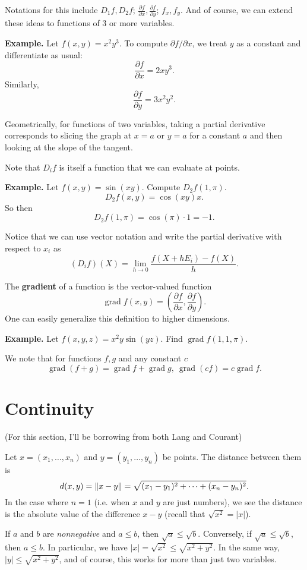 \documentclass{article}
\DeclareMathOperator{\grd}{grad}
\begin{document}
Notations for this include $D_1 f, D_2 f$; $\frac{\partial f}{\partial x}, \frac{\partial f}{\partial y}$; $f_x, f_y$. 
And of course, we can extend these ideas to functions of $3$ or more variables.

\textbf{Example.} Let $f(x,y) = x^2 y^3$. To compute $\partial f / \partial x$, we treat $y$ as a constant
and differentiate as usual:
\[\frac{\partial f}{\partial x} = 2xy^3.\]
Similarly, 
\[\frac{\partial f}{\partial y} = 3x^2y^2.\]

Geometrically, for functions of two variables, taking a partial derivative corresponds to 
slicing the graph at $x=a$ or $y=a$ for a constant $a$ and then 
looking at the slope of the tangent.

Note that $D_i f$ is itself a function that we can evaluate at points.

\textbf{Example.} Let $f(x,y) = \sin(xy)$. Compute $D_2 f (1,\pi)$.
\[D_2 f(x,y) = \cos(xy)x.\]
So then 
\[D_2 f(1,\pi) = \cos(\pi)\cdot 1 = -1.\]

Notice that we can use vector notation and write the partial derivative with respect to $x_i$ as 
\[(D_i f)(X) = \lim_{h \to 0} \frac{f(X+hE_i)-f(X)}{h}.\]

The \textbf{gradient} of a function is the vector-valued function
\[\grd f(x,y) = \left( \frac{\partial f}{\partial x}, \frac{\partial f}{\partial y} \right).\]
One can easily generalize this definition to higher dimensions. 

\textbf{Example.} Let $f(x,y,z) = x^2 y \sin(yz)$. Find $\grd f(1,1,\pi)$.

We note that for functions $f,g$ and any constant $c$
\[\grd(f+g)=\grd f + \grd g,\ \grd(cf)=c \grd f.\]

\section*{Continuity}
(For this section, I'll be borrowing from both Lang and Courant)

Let $x=(x_1,\ldots,x_n)$ and $y=(y_1,\ldots,y_n)$ be points. The distance
between them is 
\[ d(x,y)=\norm{x-y}= \sqrt{(x_1-y_1)^2+\cdots+(x_n-y_n)^2} .\]
In the case where $n=1$ (i.e. when $x$ and $y$ are just numbers), we see
the distance is the absolute value of the difference $x-y$ (recall that $\sqrt{x^2}=|x|$).

If $a$ and $b$ are \emph{nonnegative} and $a\leq b$, then 
$\sqrt{a} \leq \sqrt{b}$. Conversely, if $\sqrt{a} \leq \sqrt{b}$, then $a\leq b$. In particular,
we have $|x|=\sqrt{x^2} \leq \sqrt{x^2 + y^2}$. In the same way, $|y| \leq \sqrt{x^2+y^2}$, and of course,
this works for more than just two variables.
\end{document}
